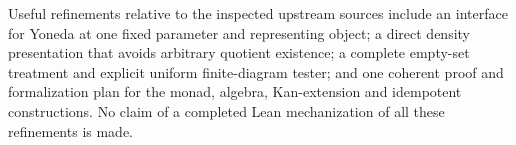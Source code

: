 Useful refinements relative to the inspected upstream sources include
an interface for Yoneda at one fixed parameter and representing object;
a direct density presentation that avoids arbitrary quotient existence;
a complete empty-set treatment and explicit uniform finite-diagram
tester; and one coherent proof and formalization plan for the monad,
algebra, Kan-extension and idempotent constructions.
No claim of a completed Lean mechanization of all these refinements is made.

